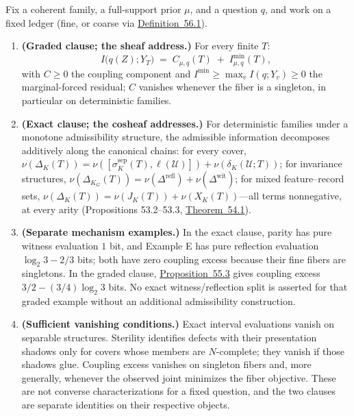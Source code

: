 
\begin{thmplain}

Fix a coherent family, a full-support prior \(\mu\), and a question \(q\), and work on a fixed ledger (fine, or coarse via \hyperlink{stmt:56.1}{Definition~56.1}).

\begin{enumerate}
\def\labelenumi{\arabic{enumi}.}
\item
  \textbf{(Graded clause; the sheaf address.)} For every finite \(T\):
  \[
  I\big(q(Z); Y_T\big) \;=\; C_{\mu,q}(T) \;+\; I^{\min}_{\mu,q}(T),
  \]
  with \(C \ge 0\) the coupling component and \(I^{\min} \ge \max_v I(q; Y_v) \ge 0\) the marginal-forced residual; \(C\) vanishes whenever the fiber is a singleton, in particular on deterministic families.
\item
  \textbf{(Exact clause; the cosheaf addresses.)} For deterministic families under a monotone admissibility structure, the admissible information decomposes additively along the canonical chains: for every cover, \(\nu(\Delta_K(T)) = \nu([\sigma^{\mathrm{sep}}_K(T), \ell(\mathcal{U})]) + \nu(\delta_K(\mathcal{U}; T))\); for invariance structures, \(\nu(\Delta_{K_G}(T)) = \nu(\Delta^{\mathrm{refl}}) + \nu(\Delta^{\mathrm{wit}})\); for mixed feature--record sets, \(\nu(\Delta_K(T)) = \nu(J_K(T)) + \nu(X_K(T))\)---\hspace{0pt}all terms nonnegative, at every arity (Propositions 53.2--53.3, \hyperlink{stmt:54.1}{Theorem~54.1}).
\item
  \textbf{(Separate mechanism examples.)} In the exact clause, parity has pure witness evaluation \(1\) bit, and Example E has pure reflection evaluation \(\log_2 3-2/3\) bits; both have zero coupling excess because their fine fibers are singletons. In the graded clause, \hyperlink{stmt:55.3}{Proposition~55.3} gives coupling excess \(3/2-(3/4)\log_2 3\) bits. No exact witness/reflection split is asserted for that graded example without an additional admissibility construction.
\item
  \textbf{(Sufficient vanishing conditions.)} Exact interval evaluations vanish on separable structures. Sterility identifies defects with their presentation shadows only for covers whose members are \(N\)-complete; they vanish if those shadows glue. Coupling excess vanishes on singleton fibers and, more generally, whenever the observed joint minimizes the fiber objective. These are not converse characterizations for a fixed question, and the two clauses are separate identities on their respective objects.

\end{enumerate}
\end{thmplain}
